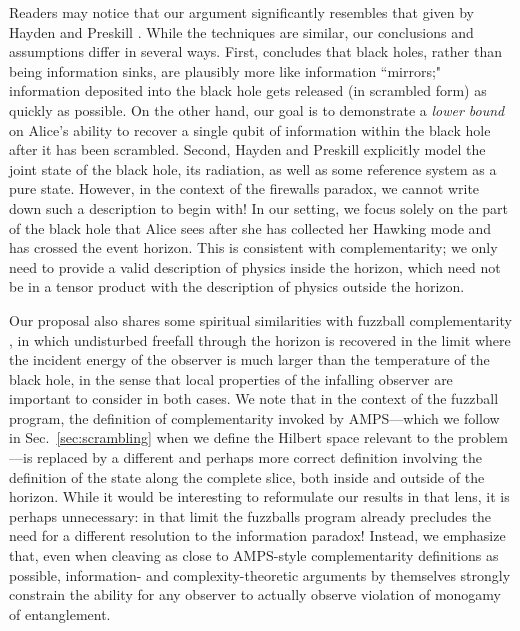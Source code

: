 \documentclass[a4paper,11pt]{article}
\theoremstyle{definition}
\newcommand{\Sec}[1]{Sec.~\ref{#1}}
\begin{document}
Readers may notice that our argument significantly resembles that given by Hayden and Preskill \cite{Hayden:2007cs}.
While the techniques are similar, our conclusions and assumptions differ in several ways.
First, \cite{Hayden:2007cs} concludes that black holes, rather than being information sinks, are plausibly more like information ``mirrors;" information deposited into the black hole gets released (in scrambled form) as quickly as possible.
On the other hand, our goal is to demonstrate a \emph{lower bound} on Alice's ability to recover a single qubit of information within the black hole after it has been scrambled.
Second, Hayden and Preskill explicitly model the joint state of the black hole, its radiation, as well as some reference system as a pure state.
However, in the context of the firewalls paradox, we cannot write down such a description to begin with!
In our setting, we focus solely on the part of the black hole that Alice sees after she has collected her Hawking mode and has crossed the event horizon.
This is consistent with complementarity; we only need to provide a valid description of physics inside the horizon, which need not be in a tensor product with the description of physics outside the horizon.

Our proposal also shares some spiritual similarities with fuzzball complementarity \cite{Mathur:2013gua}, in which undisturbed freefall through the horizon is recovered in the limit where the incident energy of the observer is much larger than the temperature of the black hole, in the sense that local properties of the infalling observer are important to consider in both cases. 
We note that in the context of the fuzzball program, the definition of complementarity invoked by AMPS---which we follow in \Sec{sec:scrambling} when we define the Hilbert space relevant to the problem---is replaced by a different and perhaps more correct definition involving the definition of the state along the complete slice, both inside and outside of the horizon. 
While it would be interesting to reformulate our results in that lens, it is perhaps unnecessary: in that limit the fuzzballs program already precludes the need for a different resolution to the information paradox! 
Instead, we emphasize that, even when cleaving as close to AMPS-style complementarity definitions as possible, information- and complexity-theoretic arguments by themselves strongly constrain the ability for any observer to actually observe violation of monogamy of entanglement.
\end{document}
